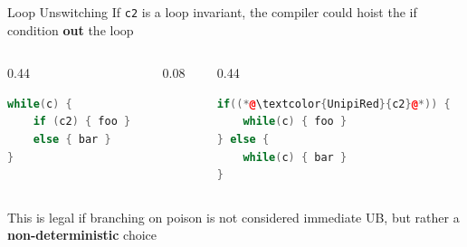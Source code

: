 \begin{frame}[fragile]{Loop Unswitching}
  If \texttt{c2} is a loop invariant, the compiler could hoist the if condition \textbf{out} the loop
    \begin{columns}[c]
        \begin{column}{0.44\textwidth}
            \begin{lstlisting}[language=C++, frame=single, xleftmargin=4pt, xrightmargin=4pt]
while(c) {
    if (c2) { foo }
    else { bar }
} 
            \end{lstlisting}
        \end{column}
        \begin{column}{0.08\textwidth}
            \transform    
        \end{column}
        \begin{column}{0.44\textwidth}
           \begin{lstlisting}[language=C++, frame=single, xleftmargin=4pt, xrightmargin=4pt]
if((*@\textcolor{UnipiRed}{c2}@*)) {
    while(c) { foo }
} else {
    while(c) { bar }
}
           \end{lstlisting} 
        \end{column}
    \end{columns}
    This is legal if branching on poison is not considered immediate UB, but rather a \textbf{non-deterministic} choice
\end{frame}
